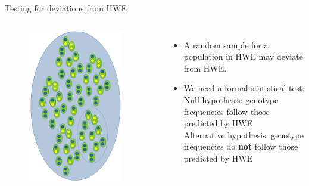 \begin{frame}{Testing for deviations from HWE}

	\begin{columns}


                \begin{figure}
                        \includegraphics[width=0.9\textwidth]{Pics/sample}
                \end{figure}


                \small
                \begin{itemize}
			\item A random sample for a population in HWE may deviate from HWE.
			\item We need a formal statistical test: \\
			\vskip 0.4cm
			Null hypothesis: genotype frequencies follow those predicted by HWE \\
			\vskip 0.2cm
			Alternative hypothesis: genotype frequencies do \textbf{not} follow those predicted by HWE
                \end{itemize}

        \end{columns}

\end{frame}


